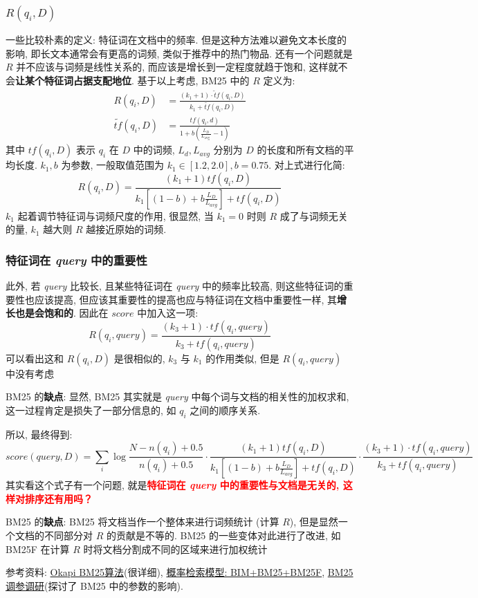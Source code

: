 \subsubsection{$R(q_i, D)$}
一些比较朴素的定义: 特征词在文档中的频率. 但是这种方法难以避免文本长度的影响, 即长文本通常会有更高的词频, 类似于推荐中的热门物品. 还有一个问题就是 $R$ 并不应该与词频是线性关系的, 而应该是增长到一定程度就趋于饱和, 这样就不会\textbf{让某个特征词占据支配地位}. 基于以上考虑, BM25 中的 $R$ 定义为:
$$
\begin{aligned}
	R\left(q_{i}, D\right) &=\frac{\left(k_{1}+1\right) \cdot \tilde{t} f\left(q_{i}, D\right)}{k_{1}+\tilde{tf}\left(q_{i}, D\right)} \\
	\tilde{t f}\left(q_{i}, D\right) &=\frac{t f\left(q_{i}, d\right)}{1+b\left(\frac{L_{D}}{L_{\text {avg }}}-1\right)}
\end{aligned}
$$
其中 $tf(q_i, D)$ 表示 $q_i$ 在 $D$ 中的词频, $L_d, L_{avg}$ 分别为 $D$ 的长度和所有文档的平均长度. $k_1, b$ 为参数, 一般取值范围为 $k_1 \in [1.2, 2.0], b=0.75$. 对上式进行化简:
$$
R(q_i, D) = \frac{(k_1+1) tf(q_i, D)}{k_1[(1 - b) + b \frac{L_D}{L_{avg}}] + tf(q_i, D)}
$$
$k_1$ 起着调节特征词与词频尺度的作用, 很显然, 当 $k_1=0$ 时则 $R$ 成了与词频无关的量, $k_1$ 越大则 $R$ 越接近原始的词频.

\subsubsection{特征词在 \textit{query} 中的重要性}
此外, 若 \textit{query} 比较长, 且某些特征词在 \textit{query} 中的频率比较高, 则这些特征词的重要性也应该提高, 但应该其重要性的提高也应与特征词在文档中重要性一样, 其\textbf{增长也是会饱和的}. 因此在 $score$ 中加入这一项:
$$
R(q_i, query) = \frac{(k_3 + 1) \cdot tf(q_i, query)}{k_3 + tf(q_i, query)}
$$
可以看出这和 $R(q_i, D)$ 是很相似的, $k_3$ 与 $k_1$ 的作用类似, 但是 $R(q_i, query)$ 中没有考虑

BM25 的\textbf{缺点}: 显然, BM25 其实就是 \textit{query} 中每个词与文档的相关性的加权求和, 这一过程肯定是损失了一部分信息的, 如 $q_i$ 之间的顺序关系. 

所以, 最终得到:
$$
score(query, D) = \sum_{i} \log \frac{N-n\left(q_{i}\right)+0.5}{n\left(q_{i}\right)+0.5} \cdot \frac{(k_1+1) tf(q_i, D)}{k_1[(1 - b) + b \frac{L_D}{L_{avg}}] + tf(q_i, D)} \cdot \frac{(k_3 + 1) \cdot tf(q_i, query)}{k_3 + tf(q_i, query)}
$$
其实看这个式子有一个问题, 就是\textbf{\textcolor{red}{特征词在 \textit{query} 中的重要性与文档是无关的, 这样对排序还有用吗？}}

BM25 的\textbf{缺点}: BM25 将文档当作一个整体来进行词频统计 (计算 $R$), 但是显然一个文档的不同部分对 $R$ 的贡献是不等的. BM25 的一些变体对此进行了改进, 如 BM25F 在计算 $R$ 时将文档分割成不同的区域来进行加权统计

参考资料: \href{https://www.cnblogs.com/geeks-reign/p/Okapi_BM25.html}{Okapi BM25算法}(很详细), \href{https://www.cnblogs.com/bentuwuying/p/6730891.html}{概率检索模型: BIM+BM25+BM25F}, \href{https://www.cnblogs.com/NaughtyBaby/p/9774836.html}{BM25 调参调研}(探讨了 BM25 中的参数的影响).